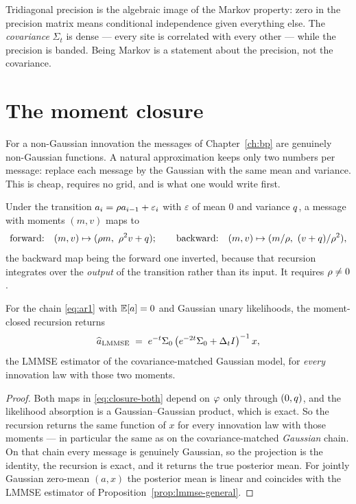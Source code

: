 \begin{intuition}
Tridiagonal precision is the algebraic image of the Markov property: zero in the precision
matrix means conditional independence given everything else. The \emph{covariance} $\Sigma_t$
is dense --- every site is correlated with every other --- while the precision is banded. Being
Markov is a statement about the precision, not the covariance.
\end{intuition}

\section{The moment closure}
\label{sec:closure-chapter}

For a non-Gaussian innovation the messages of Chapter~\ref{ch:bp} are genuinely non-Gaussian
functions. A natural approximation keeps only two numbers per message: replace each message by
the Gaussian with the same mean and variance. This is cheap, requires no grid, and is what one
would write first.

Under the transition $a_i = \rho a_{i-1}+\varepsilon_i$ with $\varepsilon$ of mean $0$ and
variance $q$, a message with moments $(m,v)$ maps to
\begin{equation}
\label{eq:closure-both}
\text{forward:}\quad (m,v)\mapsto(\corr m,\ \corr^2 v + \ivar);
\qquad
\text{backward:}\quad (m,v)\mapsto(m/\corr,\ (v+\ivar)/\corr^2),
\end{equation}
the backward map being the forward one inverted, because that recursion integrates over the
\emph{output} of the transition rather than its input. It requires $\rho\neq0$.

\begin{proposition}
\label{prop:closure-lmmse}
For the chain \eqref{eq:ar1} with $\mathbb{E}[a]=0$ and Gaussian unary likelihoods, the moment-closed
recursion returns
\begin{equation}
\label{eq:lmmse-chapter}
\widehat{a}_{\mathrm{LMMSE}} \;=\; e^{-t}\Sigma_0\left(e^{-2t}\Sigma_0+\Delta_t I\right)^{-1}x ,
\end{equation}
the LMMSE estimator of the covariance-matched Gaussian model, for \emph{every} innovation law
with those two moments.
\end{proposition}

\begin{proof}
Both maps in \eqref{eq:closure-both} depend on $\varphi$ only through $(0,q)$, and the
likelihood absorption is a Gaussian--Gaussian product, which is exact. So the recursion returns
the same function of $x$ for every innovation law with those moments --- in particular the same
as on the covariance-matched \emph{Gaussian} chain. On that chain every message is genuinely
Gaussian, so the projection is the identity, the recursion is exact, and it returns the true
posterior mean. For jointly Gaussian zero-mean $(a,x)$ the posterior mean is linear and
coincides with the LMMSE estimator of Proposition~\ref{prop:lmmse-general}.
\end{proof}

